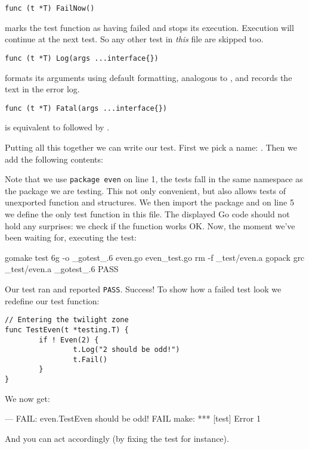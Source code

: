 \begin{lstlisting}[numbers=none]
func (t *T) FailNow()
\end{lstlisting}
 marks the test function as having failed and stops its execution.
Execution will continue at the next test. So any other test in
\emph{this} file are skipped too.

\begin{lstlisting}[numbers=none]
func (t *T) Log(args ...interface{})
\end{lstlisting}
 formats its arguments using default formatting, analogous to
, and records the text in the error log.

\begin{lstlisting}[numbers=none]
func (t *T) Fatal(args ...interface{})
\end{lstlisting}
 is equivalent to  followed by .

Putting all this together we can write our test. First
we pick a name: . Then we add the following contents:

Note that we use \lstinline{package even} on line 1, the tests fall in the same
namespace as the package we are testing. This not only convenient, but
also allows tests of unexported function and structures. We then import
the  package and on line 5 we define the only test
function in this file. The displayed Go code should not hold any
surprises: we check if the  function works OK. 
Now, the moment we've been waiting for, executing the test:
\begin{display}
\pr gomake test
6g -o \_gotest\_.6 even.go  even\_test.go
rm -f \_test/even.a
gopack grc \_test/even.a \_gotest\_.6 
PASS
\end{display}
\noindent{}Our test ran and reported \texttt{PASS}. Success! To show how a failed
test look we redefine our test function:
\begin{lstlisting}
// Entering the twilight zone
func TestEven(t *testing.T) {
        if ! Even(2) {
                t.Log("2 should be odd!")
                t.Fail()
        }   
}
\end{lstlisting}
We now get:
\begin{display}
--- FAIL: even.TestEven
\qquad{} should be odd!
FAIL
make: *** [test] Error 1
\end{display}
\noindent{}And you can act accordingly (by fixing the test for instance).

